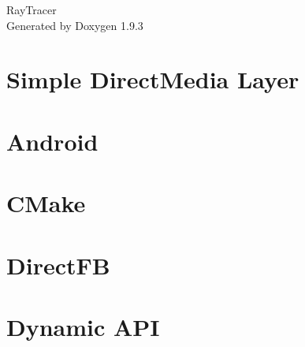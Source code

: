 \documentclass[twoside]{book}
\newcommand{\+}{\discretionary{\mbox{\scriptsize$\hookleftarrow$}}{}{}}
\newcommand{\clearemptydoublepage}{%
    \newpage{\pagestyle{empty}\cleardoublepage}%
  }
\begin{document}
  \raggedbottom
    \hypersetup{pageanchor=false,
                bookmarksnumbered=true,
                pdfencoding=unicode
               }
  \begin{titlepage}
  \vspace*{7cm}
  \begin{center}%
  {\Large Ray\+Tracer}\\
  \vspace*{1cm}
  {\large Generated by Doxygen 1.9.3}\\
  \end{center}
  \end{titlepage}
  \clearemptydoublepage
  \tableofcontents
  \clearemptydoublepage
  \hypersetup{pageanchor=true}
\chapter{Simple Direct\+Media Layer}
\label{index}\hypertarget{index}{}
\chapter{Android}
\label{md__d___ray_tracing_docs__r_e_a_d_m_e_android}

\chapter{CMake}
\label{md__d___ray_tracing_docs__r_e_a_d_m_e_cmake}

\chapter{Direct\+FB}
\label{md__d___ray_tracing_docs__r_e_a_d_m_e_directfb}

\chapter{Dynamic API}
\label{md__d___ray_tracing_docs__r_e_a_d_m_e_dynapi}

\end{document}
